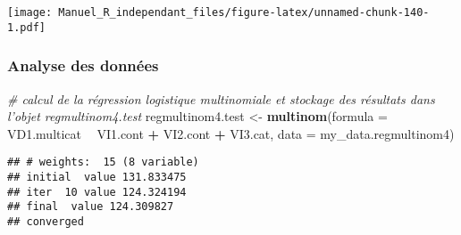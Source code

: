 \documentclass[
]{book}
\newenvironment{Shaded}{\begin{snugshade}}{\end{snugshade}}
\newcommand{\CommentTok}[1]{\textcolor[rgb]{0.56,0.35,0.01}{\textit{#1}}}
\newcommand{\DataTypeTok}[1]{\textcolor[rgb]{0.13,0.29,0.53}{#1}}
\newcommand{\KeywordTok}[1]{\textcolor[rgb]{0.13,0.29,0.53}{\textbf{#1}}}
\newcommand{\NormalTok}[1]{#1}
\newcommand{\OperatorTok}[1]{\textcolor[rgb]{0.81,0.36,0.00}{\textbf{#1}}}
\newcommand{\StringTok}[1]{\textcolor[rgb]{0.31,0.60,0.02}{#1}}
\begin{document}
\texttt{[image: Manuel\_R\_independant\_files/figure-latex/unnamed-chunk-140-1.pdf]}

\hypertarget{analyse-des-donnuxe9es-16}{%
\subsubsection{Analyse des données}\label{analyse-des-donnuxe9es-16}}

\begin{Shaded}
\begin{Highlighting}[]
\CommentTok{# calcul de la régression logistique multinomiale et stockage des résultats dans l’objet regmultinom4.test}
\NormalTok{regmultinom4.test <-}\StringTok{ }\KeywordTok{multinom}\NormalTok{(}\DataTypeTok{formula =}\NormalTok{ VD1.multicat }\OperatorTok{~}\StringTok{ }\NormalTok{VI1.cont }\OperatorTok{+}\StringTok{ }\NormalTok{VI2.cont }\OperatorTok{+}\StringTok{ }\NormalTok{VI3.cat, }
                              \DataTypeTok{data =}\NormalTok{ my_data.regmultinom4)}
\end{Highlighting}
\end{Shaded}

\begin{verbatim}
## # weights:  15 (8 variable)
## initial  value 131.833475 
## iter  10 value 124.324194
## final  value 124.309827 
## converged
\end{verbatim}
\end{document}
